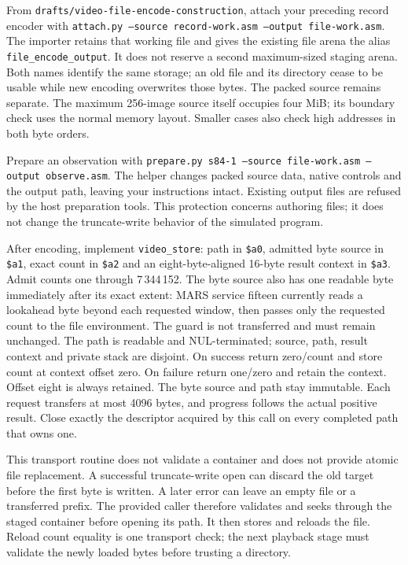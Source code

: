 From \texttt{drafts/video-file-encode-construction}, attach your preceding record
encoder with \texttt{attach.py --source record-work.asm --output file-work.asm}.
The importer retains that working file and gives the existing file arena the alias
\texttt{file\_encode\_output}. It does not reserve a second maximum-sized staging
arena. Both names identify the same storage; an old file and its directory cease
to be usable while new encoding overwrites those bytes. The packed source remains
separate. The maximum 256-image source itself occupies four MiB; its boundary check
uses the normal memory layout. Smaller cases also check high addresses in both
byte orders.

Prepare an observation with \texttt{prepare.py s84-1 --source file-work.asm --output
  observe.asm}. The helper changes packed source data, native controls and the output
path, leaving your instructions intact. Existing output files are refused by the
host preparation tools. This protection concerns authoring files; it does not
change the truncate-write behavior of the simulated program.

After encoding, implement \texttt{video\_store}: path in \texttt{\$a0}, admitted
byte source in \texttt{\$a1}, exact count in \texttt{\$a2} and an eight-byte-aligned
16-byte result context in \texttt{\$a3}. Admit counts one through 7\,344\,152.
The byte source also has one readable byte immediately after its exact extent:
MARS service fifteen currently reads a lookahead byte beyond each requested
window, then passes only the requested count to the file environment. The guard
is not transferred and must remain unchanged. The path is readable and
NUL-terminated; source, path, result context and private
stack are disjoint. On success return zero/count and store count at context offset
zero. On failure return one/zero and retain the context. Offset eight is always
retained. The byte source and path stay immutable. Each request transfers at most
4096 bytes, and progress follows the actual positive result. Close exactly the
descriptor acquired by this call on every completed path that owns one.

This transport routine does not validate a container and does not provide atomic
file replacement. A successful truncate-write open can discard the old target
before the first byte is written. A later error can leave an empty file or a
transferred prefix. The provided caller therefore validates and seeks through the
staged container before opening its path. It then stores and reloads the file.
Reload count equality is one transport check; the next playback stage must validate
the newly loaded bytes before trusting a directory.
